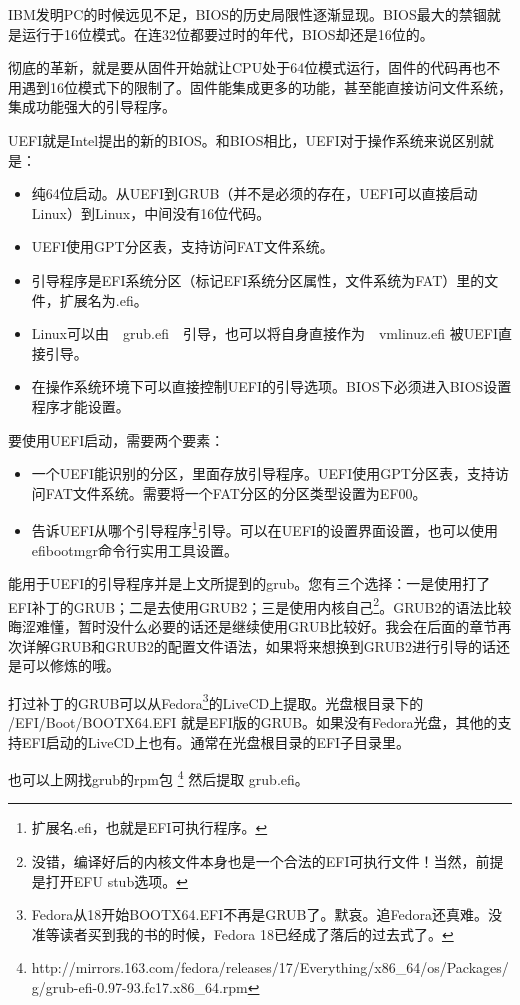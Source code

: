IBM发明PC的时候远见不足，BIOS的历史局限性逐渐显现。BIOS最大的禁锢就是运行于16位模式。在连32位都要过时的年代，BIOS却还是16位的。

彻底的革新，就是要从固件开始就让CPU处于64位模式运行，固件的代码再也不用遇到16位模式下的限制了。固件能集成更多的功能，甚至能直接访问文件系统，集成功能强大的引导程序。

UEFI就是Intel提出的新的BIOS。和BIOS相比，UEFI对于操作系统来说区别就是：
\begin{itemize}
\item 纯64位启动。从UEFI到GRUB（并不是必须的存在，UEFI可以直接启动Linux）到Linux，中间没有16位代码。
\item UEFI使用GPT分区表，支持访问FAT文件系统。
\item 引导程序是EFI系统分区（标记EFI系统分区属性，文件系统为FAT）里的文件，扩展名为.efi。
\item Linux可以由　grub.efi　引导，也可以将自身直接作为　vmlinuz.efi 被UEFI直接引导。
\item 在操作系统环境下可以直接控制UEFI的引导选项。BIOS下必须进入BIOS设置程序才能设置。
\end{itemize}

要使用UEFI启动，需要两个要素：
\begin{itemize}
\item 一个UEFI能识别的分区，里面存放引导程序。UEFI使用GPT分区表，支持访问FAT文件系统。需要将一个FAT分区的分区类型设置为EF00。
\item 告诉UEFI从哪个引导程序\footnote{扩展名.efi，也就是EFI可执行程序。}引导。可以在UEFI的设置界面设置，也可以使用efibootmgr命令行实用工具设置。
\end{itemize}

能用于UEFI的引导程序并是上文所提到的grub。您有三个选择：一是使用打了EFI补丁的GRUB；二是去使用GRUB2；三是使用内核自己\footnote{没错，编译好后的内核文件本身也是一个合法的EFI可执行文件！当然，前提是打开EFU stub选项。}。GRUB2的语法比较晦涩难懂，暂时没什么必要的话还是继续使用GRUB比较好。我会在后面的章节再次详解GRUB和GRUB2的配置文件语法，如果将来想换到GRUB2进行引导的话还是可以修炼的哦。

打过补丁的GRUB可以从Fedora\footnote{Fedora从18开始BOOTX64.EFI不再是GRUB了。默哀。追Fedora还真难。没准等读者买到我的书的时候，Fedora 18已经成了落后的过去式了。}的LiveCD上提取。光盘根目录下的 /EFI/Boot/BOOTX64.EFI 就是EFI版的GRUB。如果没有Fedora光盘，其他的支持EFI启动的LiveCD上也有。通常在光盘根目录的EFI子目录里。

也可以上网找grub的rpm包
\footnote{%
http://mirrors.163.com/fedora/releases/17/Everything/x86\_64/os/Packages/g/grub-efi-0.97-93.fc17.x86\_64.rpm
}
然后提取 grub.efi。

